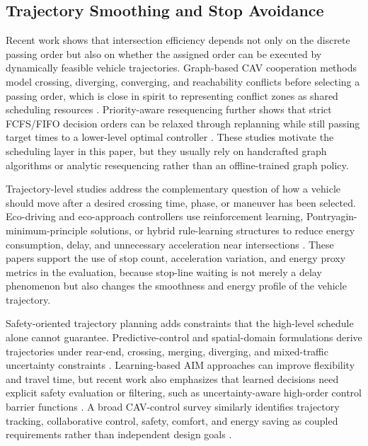 \subsection{Trajectory Smoothing and Stop Avoidance}
\begin{addedtodayblock}
Recent work shows that intersection efficiency depends not only on the discrete passing order but also on whether the assigned order can be executed by dynamically feasible vehicle trajectories. Graph-based CAV cooperation methods model crossing, diverging, converging, and reachability conflicts before selecting a passing order, which is close in spirit to representing conflict zones as shared scheduling resources \cite{chen2021conflictfree,chen2021lanechanging}. Priority-aware resequencing further shows that strict FCFS/FIFO decision orders can be relaxed through replanning while still passing target times to a lower-level optimal controller \cite{chalaki2021priority}. These studies motivate the scheduling layer in this paper, but they usually rely on handcrafted graph algorithms or analytic resequencing rather than an offline-trained graph policy.

Trajectory-level studies address the complementary question of how a vehicle should move after a desired crossing time, phase, or maneuver has been selected. Eco-driving and eco-approach controllers use reinforcement learning, Pontryagin-minimum-principle solutions, or hybrid rule-learning structures to reduce energy consumption, delay, and unnecessary acceleration near intersections \cite{bai2022hybrid,jiang2023ecodriving,lakshmanan2022cooperative,dong2023overtaking}. These papers support the use of stop count, acceleration variation, and energy proxy metrics in the evaluation, because stop-line waiting is not merely a delay phenomenon but also changes the smoothness and energy profile of the vehicle trajectory.

Safety-oriented trajectory planning adds constraints that the high-level schedule alone cannot guarantee. Predictive-control and spatial-domain formulations derive trajectories under rear-end, crossing, merging, diverging, and mixed-traffic uncertainty constraints \cite{mahbub2022safety,zhao2025spatial}. Learning-based AIM approaches can improve flexibility and travel time, but recent work also emphasizes that learned decisions need explicit safety evaluation or filtering, such as uncertainty-aware high-order control barrier functions \cite{luo2023realtime,yu2025uncertainty,cederle2024distributed,li2023dhal}. A broad CAV-control survey similarly identifies trajectory tracking, collaborative control, safety, comfort, and energy saving as coupled requirements rather than independent design goals \cite{liu2023systematic}.


\end{addedtodayblock}
